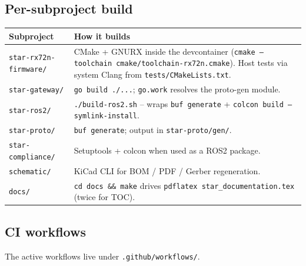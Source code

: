 \subsection{Per-subproject build}

\begin{center}
\begin{tabular}{|p{4.5cm}|p{10.0cm}|}
\hline
\textbf{Subproject}                  & \textbf{How it builds}                                                                                                         \\
\hline
\texttt{star-rx72n-firmware/}        & CMake + GNURX inside the devcontainer (\texttt{cmake --toolchain cmake/toolchain-rx72n.cmake}). Host tests via system Clang from \texttt{tests/CMakeLists.txt}. \\
\texttt{star-gateway/}               & \texttt{go build ./...}; \texttt{go.work} resolves the proto-gen module.                                                       \\
\texttt{star-ros2/}                  & \texttt{./build-ros2.sh} -- wraps \texttt{buf generate} + \texttt{colcon build --symlink-install}.                              \\
\texttt{star-proto/}                 & \texttt{buf generate}; output in \texttt{star-proto/gen/}.                                                                      \\
\texttt{star-compliance/}            & Setuptools + colcon when used as a ROS2 package.                                                                                \\
\texttt{schematic/}                  & KiCad CLI for BOM / PDF / Gerber regeneration.                                                                                  \\
\texttt{docs/}                       & \texttt{cd docs \&\& make} drives \texttt{pdflatex star\_documentation.tex} (twice for TOC).                                     \\
\hline
\end{tabular}
\end{center}

\subsection{CI workflows}

The active workflows live under \texttt{.github/workflows/}.

